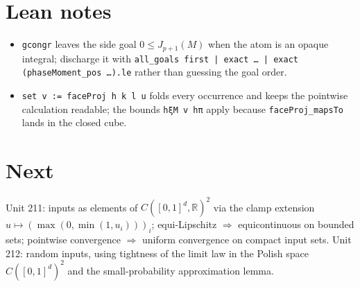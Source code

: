\documentclass[11pt]{article}
\begin{document}
\section{Lean notes}
\begin{itemize}
\item \texttt{gcongr} leaves the side goal $0\le J_{p+1}(M)$ when the atom is an opaque integral;
  discharge it with \texttt{all\_goals first | exact … | exact (phaseMoment\_pos …).le} rather than
  guessing the goal order.
\item \texttt{set v := faceProj h k l u} folds every occurrence and keeps the pointwise calculation
  readable; the bounds \texttt{hξM v hπ} apply because \texttt{faceProj\_mapsTo} lands in the
  closed cube.
\end{itemize}

\section{Next}
Unit 211: inputs as elements of $C([0,1]^d,\mathbb R)^2$ via the clamp extension
$u\mapsto(\max(0,\min(1,u_i)))_i$; equi-Lipschitz $\Rightarrow$ equicontinuous on bounded sets;
pointwise convergence $\Rightarrow$ uniform convergence on compact input sets. Unit 212: random
inputs, using tightness of the limit law in the Polish space $C([0,1]^d)^2$ and the small-probability
approximation lemma.
\end{document}
